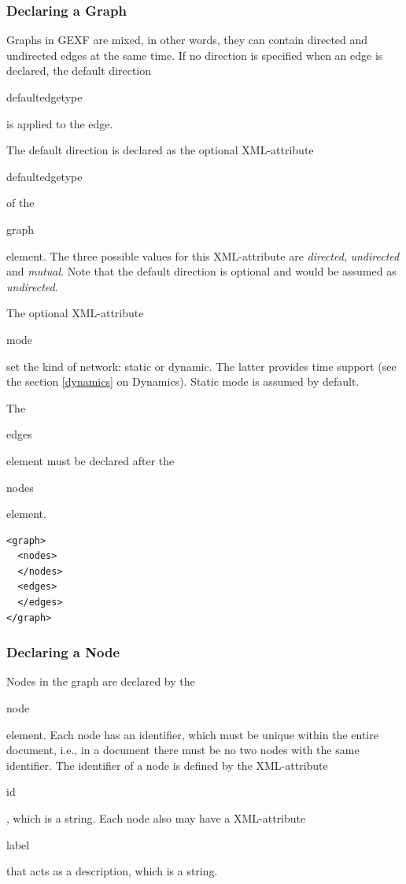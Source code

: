 \documentclass[a4paper,10pt]{article}
\begin{document}
\subsubsection{Declaring a Graph}

Graphs in GEXF are mixed, in other words, they can contain directed and undirected edges at the same time. If no direction is specified when an edge is declared, the default direction \begin{footnotesize}defaultedgetype\end{footnotesize} is applied to the edge.

The default direction is declared as the optional XML-attribute \begin{footnotesize}defaultedgetype\end{footnotesize} of the \begin{footnotesize}graph\end{footnotesize} element. The three possible values for this XML-attribute are \textit{directed}, \textit{undirected} and \textit{mutual}. Note that the default direction is optional and would be assumed as \textit{undirected}.

The optional XML-attribute \begin{footnotesize}mode\end{footnotesize} set the kind of network: static or dynamic. The latter provides time support (see  the section \ref{dynamics} on Dynamics). Static mode is assumed by default.

The \begin{footnotesize}edges\end{footnotesize} element must be declared after the \begin{footnotesize}nodes\end{footnotesize} element.

\lstset{ style=gexf }
\begin{lstlisting}[caption={An empty graph!},label=aGraph]
<graph>
  <nodes>
  </nodes>
  <edges>
  </edges>
</graph>
\end{lstlisting}

\subsubsection{Declaring a Node}

Nodes in the graph are declared by the \begin{footnotesize}node\end{footnotesize} element. Each node has an identifier, which must be unique within the entire document, i.e., in a document there must be no two nodes with the same identifier. The identifier of a node is defined by the XML-attribute \begin{footnotesize}id\end{footnotesize}, which is a string. Each node also may have a XML-attribute \begin{footnotesize}label\end{footnotesize} that acts as a description, which is a string.
\end{document}
